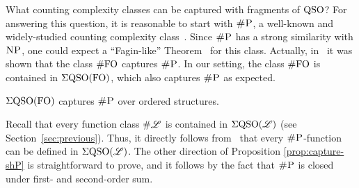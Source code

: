 What counting complexity classes can be captured with fragments of ${\rm QSO}$?
For answering this question, it is reasonable to start with $\text{\sc \#P}$, a well-known and widely-studied counting complexity class~\cite{arora2009computational}. 
Since $\text{\sc \#P}$ has a strong similarity with $\text{\sc NP}$, one could expect a ``Fagin-like'' Theorem~\cite{fagin1974generalized} for this class. 
Actually, in~\cite{SalujaST95} it was shown that the class $\#{\rm FO}$ captures $\text{\sc \#P}$.
In our setting, the class $\#{\rm FO}$ is contained in $\Sigma{\rm QSO}({\rm FO})$, which also captures $\text{\sc \#P}$ as expected. 
\begin{proposition} \label{prop:capture-shP}
	$\Sigma{\rm QSO}({\rm FO})$ captures $\text{\sc \#P}$ over ordered structures.
\end{proposition}
Recall  that every function class $\# \mathscr{L}$ is contained in $\Sigma{\rm QSO}(\mathscr{L})$ (see Section~\ref{sec:previous}). Thus, it directly follows from~\cite{SalujaST95}  that every $\text{\sc \#P}$-function can be defined in $\Sigma{\rm QSO}(\mathscr{L})$. The other direction of Proposition \ref{prop:capture-shP} is straightforward to prove, and it follows by the fact that $\text{\sc \#P}$ is closed under first- and second-order sum.

